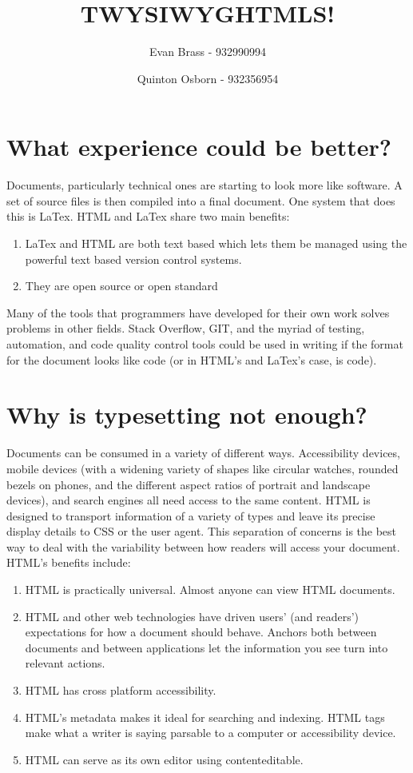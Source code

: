 \documentclass[12pt]{article}
\title{TWYSIWYGHTMLS!}
\author{
	Evan Brass - 932990994
	\and
	Quinton Osborn - 932356954
}
\begin{document}
\maketitle
\tableofcontents

\pagebreak


\section{What experience could be better?}
{
	Documents, particularly technical ones are starting to look more like software.  A set of source files is then compiled into a final document.  One system that does this is LaTex.  HTML and LaTex share two main benefits:
	\begin{enumerate}
		\item LaTex and HTML are both text based which lets them be managed using the powerful text based version control systems.
		\item They are open source or open standard
	\end{enumerate}
	Many of the tools that programmers have developed for their own work solves problems in other fields.  Stack Overflow, GIT, and the myriad of testing, automation, and code quality control tools could be used in writing if the format for the document looks like code (or in HTML’s and LaTex’s case, is code).
}


\section{Why is typesetting not enough?}
{
	Documents can be consumed in a variety of different ways.  Accessibility devices, mobile devices (with a widening variety of shapes like circular watches, rounded bezels on phones, and the different aspect ratios of 	portrait and landscape devices), and search engines all need access to the same content.  HTML is designed to transport information of a variety of types and leave its precise display details to CSS or the user agent.  This separation of concerns is the best way to deal with the variability between how readers will access your document.  HTML’s benefits include:
	\begin{enumerate}
	\item HTML is practically universal.  Almost anyone can view HTML documents.
	\item HTML and other web technologies have driven users’ (and readers’) expectations for how a document should behave.  Anchors both between documents and between applications let the information you see turn into relevant actions.
	\item HTML has cross platform accessibility.
	\item HTML’s metadata makes it ideal for searching and indexing.  HTML tags make what a writer is saying parsable to a computer or accessibility device.
	\item HTML can serve as its own editor using contenteditable.
	\end{enumerate}

}
\end{document}
